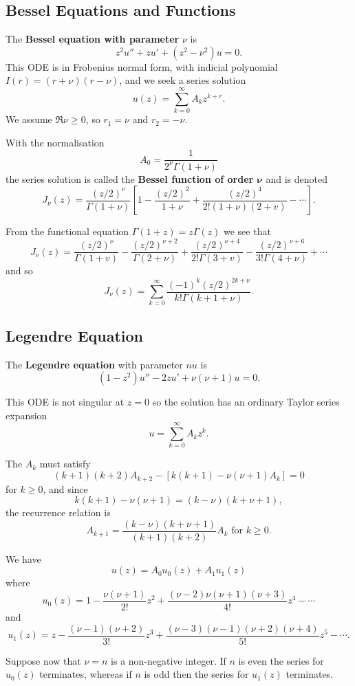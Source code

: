 \subsection{Bessel Equations and Functions}
The \textbf{Bessel equation with parameter} \(\nu\) is
\[z^2u'' + zu' + (z^2 - \nu^2)u = 0.\]
This ODE is in Frobenius normal form, with indicial polynomial \(I(r) = (r + \nu)(r - \nu)\),
and we seek a series solution
\[u(z) = \sum_{k=0}^{\infty} A_k z^{k + r}.\]
We assume \(\Re \nu \geq 0\), so \(r_1 = \nu\) and \(r_2 = -\nu\).

With the normalisation
\[A_0 = \frac{1}{2^\nu\Gamma(1 + \nu)}\]
the series solution is called the \textbf{Bessel function of order \(\mathbf{\nu}\)} and is denoted
\[J_\nu (z) = \frac{(z/2)^\nu}{\Gamma(1+\nu)} \left[1 - \frac{(z/2)^2}{1+\nu} + \frac{(z/2)^4}{2!(1+\nu)(2+v)}- \cdots\right].\]

From the functional equation \(\Gamma(1+z) = z\Gamma(z)\) we see that
\[J_\nu (z) = \frac{(z/2)^\nu}{\Gamma(1+v)}-\frac{(z/2)^{\nu+2}}{\Gamma(2+\nu)} + \frac{(z/2)^{\nu + 4}}{2!\Gamma(3+v)} - \frac{(z/2)^{\nu + 6}}{3!\Gamma(4+\nu)}+ \cdots\]
and so
\[J_\nu (z) = \sum_{k=0}^{\infty} \frac{(-1)^k (z/2)^{2k + \nu}}{k!\Gamma(k + 1 + \nu)}.\]

\subsection{Legendre Equation}
The \textbf{Legendre equation} with parameter \(nu\) is
\[(1-z^2)u'' - 2zu' + \nu(\nu + 1)u = 0.\]

This ODE is not singular at \(z = 0\) so the solution has an ordinary Taylor series expansion
\[u = \sum_{k = 0}^{\infty}A_kz^k.\]

The \(A_k\) must satisfy
\[(k+1)(k+2)A_{k+2} - [k(k+1) - \nu(\nu + 1)A_k] = 0\]
for \(k \geq 0\), and since
\[k(k+1) - \nu(\nu + 1) = (k - \nu)(k + \nu + 1),\]
the recurrence relation is
\[A_{k+1} = \frac{(k-\nu)(k + \nu + 1)}{(k + 1)(k+ 2)}A_k \text{ for } k \geq 0.\]

We have
\[u(z) = A_0u_0 (z) + A_1u_1(z)\]
where
\[u_0(z) = 1 - \frac{\nu(\nu + 1)}{2!}z^2 + \frac{(\nu - 2)\nu(\nu + 1)(\nu +3)}{4!}z^4 - \cdots\]
and
\[u_1(z) = z - \frac{(\nu - 1)(\nu + 2)}{3!}z^3 + \frac{(\nu - 3)(\nu - 1)(\nu + 2)(\nu + 4)}{5!}z^5 - \cdots.\]

Suppose now that \(\nu = n\) is a non-negative integer. If \(n\) is even the series for \(u_0(z)\) terminates, whereas if \(n\) is odd then the series for \(u_1(z)\) terminates. \\

